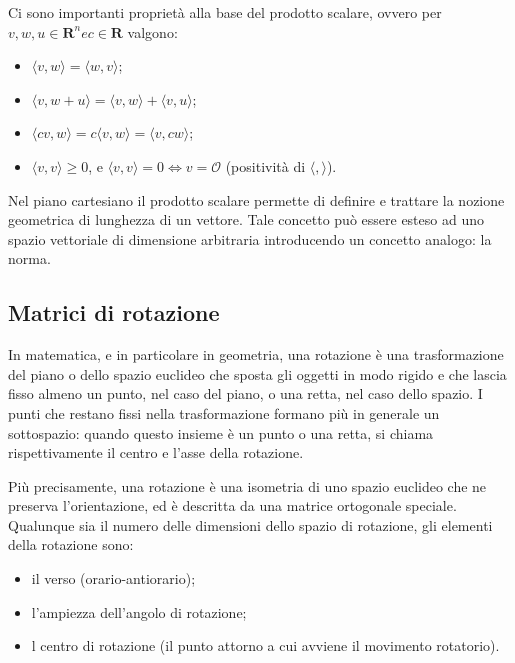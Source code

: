 Ci sono importanti proprietà alla base del prodotto scalare, ovvero per $v, w, u \in \mathbf{R}^n e c \in \mathbf{R}$ valgono:
\vspace{10pt}
\begin{itemize}
	\item $\langle v,w \rangle = \langle w,v \rangle$;
	\vspace{5pt}
	\item $\langle v,w + u \rangle = \langle v,w \rangle + \langle v,u \rangle$;
	\vspace{5pt}
	\item $\langle cv,w \rangle = c\langle v,w \rangle = \langle v,cw \rangle$;
	\vspace{5pt}
	\item $\langle v,v \rangle \ge 0$, e $\langle v,v \rangle = 0 \iff v = \mathcal{O}$ (positività di $\langle , \rangle$).
\end{itemize}

Nel piano cartesiano il prodotto scalare permette di definire e trattare la nozione geometrica di lunghezza di un vettore. Tale concetto può essere esteso ad uno spazio vettoriale di dimensione arbitraria introducendo un concetto analogo: la norma. 

\subsection{Matrici di rotazione}\label{subsec:matrici_rotazione}
In matematica, e in particolare in geometria, una rotazione è una trasformazione del piano o dello spazio euclideo che sposta gli oggetti in modo rigido e che lascia fisso almeno un punto, nel caso del piano, o una retta, nel caso dello spazio. I punti che restano fissi nella trasformazione formano più in generale un sottospazio: quando questo insieme è un punto o una retta, si chiama rispettivamente il centro e l'asse della rotazione.

Più precisamente, una rotazione è una isometria di uno spazio euclideo che ne preserva l'orientazione, ed è descritta da una matrice ortogonale speciale. Qualunque sia il numero delle dimensioni dello spazio di rotazione, gli elementi della rotazione sono:
\vspace{10pt}
\begin{itemize}
	\item il verso (orario-antiorario);
	\vspace{5pt}
	\item l'ampiezza dell'angolo di rotazione;
	\vspace{5pt}
	\item l centro di rotazione (il punto attorno a cui avviene il movimento rotatorio).
\end{itemize}

